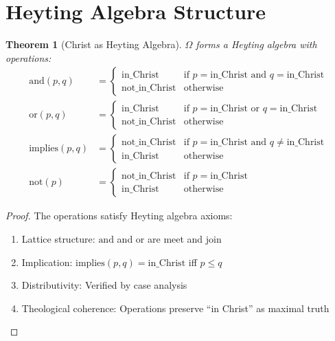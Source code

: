 \documentclass{article}
\newtheorem{theorem}{Theorem}
\begin{document}
\section{Heyting Algebra Structure}

\begin{theorem}[Christ as Heyting Algebra]
$\Omega$ forms a Heyting algebra with operations:
\begin{align*}
\text{and}(p, q) & =
\begin{cases}
\text{in\_Christ} & \text{if } p = \text{in\_Christ} \text{ and } q = \text{in\_Christ} \\
\text{not\_in\_Christ} & \text{otherwise}
\end{cases} \\
\text{or}(p, q) & =
\begin{cases}
\text{in\_Christ} & \text{if } p = \text{in\_Christ} \text{ or } q = \text{in\_Christ} \\
\text{not\_in\_Christ} & \text{otherwise}
\end{cases} \\
\text{implies}(p, q) & =
\begin{cases}
\text{not\_in\_Christ} & \text{if } p = \text{in\_Christ} \text{ and } q \neq \text{in\_Christ} \\
\text{in\_Christ} & \text{otherwise}
\end{cases} \\
\text{not}(p) & =
\begin{cases}
\text{not\_in\_Christ} & \text{if } p = \text{in\_Christ} \\
\text{in\_Christ} & \text{otherwise}
\end{cases}
\end{align*}
\end{theorem}

\begin{proof}
The operations satisfy Heyting algebra axioms:
\begin{enumerate}
    \item Lattice structure: $\text{and}$ and $\text{or}$ are meet and join
    \item Implication: $\text{implies}(p, q) = \text{in\_Christ}$ iff $p \leq q$
    \item Distributivity: Verified by case analysis
    \item Theological coherence: Operations preserve ``in Christ'' as maximal truth
\end{enumerate}
\end{proof}
\end{document}
